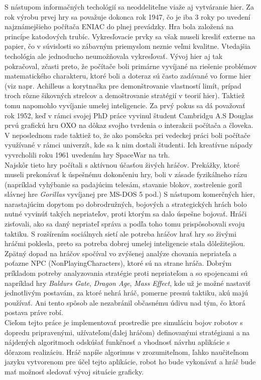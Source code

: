 \indent S nástupom informačných techológií sa neoddeliteľne viaže aj vytváranie hier. Za rok výrobu prvej hry sa považuje dokonca rok 1947, čo je iba 3 roky po uvedení najznámejšieho počítača ENIAC do plnej prevádzky\cite{historia}. Hra bola založená na princípe katodových trubíc. Vykresľovacie prvky sa  však museli kresliť externe na papier, čo v súvislosti so zábavným priemyslom neznie veľmi kvalitne. Vtedajšia techológia ale jednoducho neumožňovala vykresľovať. Vývoj hier aj tak pokračoval, zčasti preto, že počítače boli primárne vyvíjané na riešenie problémov matematického charakteru, ktoré boli a doteraz sú často zadávané vo forme hier (viz napr. Achilleus a korytnačka pre demonštrovanie vlastností limít, prípad troch rôzne šikovných strelcov a demoštrovanie stratégií v teorií hier). Taktiež tomu napomohlo vyvíjanie umelej inteligencie. Za prvý pokus sa dá považovať rok 1952, keď v rámci svojej PhD práce vyvinul študent Cambridgu A.S Douglas prvú grafickú hru OXO na dôkaz svojho tvrdenia o interakcii počítača a človeka. V neposlednom rade taktiež to, že ako pomôcka pri vedeckej práci boli počítače využívané v rámci univerzít, kde sa k nim dostali študenti. Ich kreatívne nápady vyvrcholili roku 1961 uvedením hry SpaceWar na trh. \\
\indent Najskôr tieto hry počítali s aktívnou účasťou živých hráčov. Prekážky, ktoré museli prekonávať k úspešnému dokončeniu hry, boli v zásade fyzikálneho rázu (napríklad vyhýbanie sa padajúcim telesám, stavanie blokov, zostrelenie goríl slávnej hre \emph{Gorillas} vyvíjanej pre MS-DOS 5 pod.) S nástupom komerčných hier, narastajúcim dopytom po dobrodružných, bojových a strategických hrách bolo nutné vyvinúť takých nepriateľov, proti ktorým sa dalo úspešne bojovať. Hráči zisťovali, ako sa daný nepriateľ správa a podľa toho tomu prispôsobovali svoju taktiku. S rozšírením sociálnych sietí ale potreba hráčov hrať hry so živými hráčmi poklesla, preto sa potreba dobrej umelej inteligencie stala dôležitejšou. Zpätný dopad na hráčov spočíval vo zvýšenej analýze chovania nepriateľa a poťazne NPC (NonPlayingCharacters), ktoré sú na strane hráča. Dobrým príkladom potreby analyzovania stratégie proti nepriateľom a so spojencami sú napríklad hry \emph{Baldurs Gate\cite{bioware}}, \emph{Dragon Age\cite{bioware}}, \emph{Mass Effect\cite{bioware}}, kde už je možné nastaviť jednotlivým postavám, za ktoré nehrá hráč, pomerne presnú taktiku, akú majú používať. Ani tento spôsob ale nezabránil občasnému údivu nad tým, čo ktorá postava práve robí. \\
\indent Cieľom tejto práce je implementovať prostredie pre simuláciu bojov robotov s dopredu pripravenými, užívateľom(ďalej hráčom) definovanými stratégiami a na nájdených algoritmoch odskúšať funkčnosť a vhodnosť návrhu aplikácie s dôrazom realizáciu. Hráč napíše algorimus v zrozumiteľnom, ľahko naučiteľnom jazyku vytvorenom pre účel tejto aplikácie, robot ho bude vykonávať a hráč bude mať možnosť sledovať vývoj situácie graficky.
